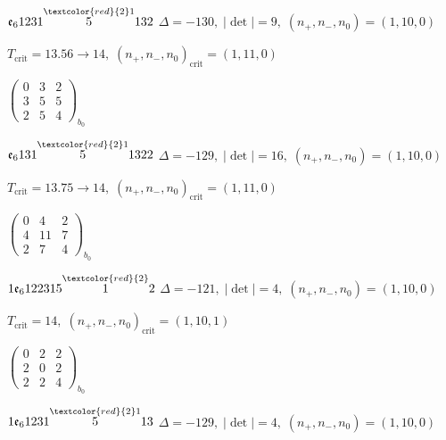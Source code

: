 \documentclass[10pt]{article}
\begin{document}
\smallskip

$\mathfrak{e}_61231\overset{\textcolor{red}{2}1}{5}132$ \quad $\Delta=-130,\; |\det|=9,\; (n_+,n_-,n_0)=(1,10,0)$

\hspace{1em}$T_{\text{crit}}=13.56 \to 14,\; (n_+,n_-,n_0)_{\text{crit}}=(1,11,0)$

\hspace{2em}$\left(\begin{smallmatrix}0 & 3 & 2 \\ 3 & 5 & 5 \\ 2 & 5 & 4\end{smallmatrix}\right)_{\!b_0}$

\smallskip

$\mathfrak{e}_6131\overset{\textcolor{red}{2}1}{5}1322$ \quad $\Delta=-129,\; |\det|=16,\; (n_+,n_-,n_0)=(1,10,0)$

\hspace{1em}$T_{\text{crit}}=13.75 \to 14,\; (n_+,n_-,n_0)_{\text{crit}}=(1,11,0)$

\hspace{2em}$\left(\begin{smallmatrix}0 & 4 & 2 \\ 4 & 11 & 7 \\ 2 & 7 & 4\end{smallmatrix}\right)_{\!b_0}$

\smallskip

$1\mathfrak{e}_6122315\overset{\textcolor{red}{2}}{1}2$ \quad $\Delta=-121,\; |\det|=4,\; (n_+,n_-,n_0)=(1,10,0)$

\hspace{1em}$T_{\text{crit}}=14,\; (n_+,n_-,n_0)_{\text{crit}}=(1,10,1)$

\hspace{2em}$\left(\begin{smallmatrix}0 & 2 & 2 \\ 2 & 0 & 2 \\ 2 & 2 & 4\end{smallmatrix}\right)_{\!b_0}$

\smallskip

$1\mathfrak{e}_61231\overset{\textcolor{red}{2}1}{5}13$ \quad $\Delta=-129,\; |\det|=4,\; (n_+,n_-,n_0)=(1,10,0)$
\end{document}
